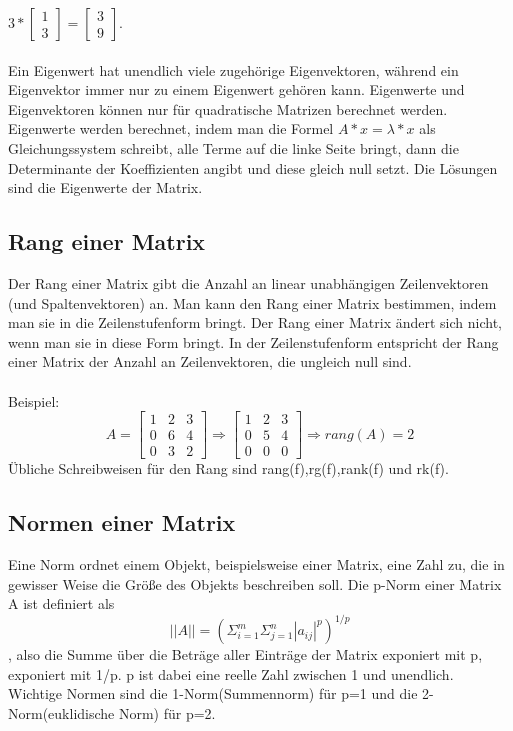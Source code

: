 \documentclass[11pt]{scrreprt}
\begin{document}
$3*\begin{bmatrix}
1 \\ 
3  
\end {bmatrix} 
=
\begin{bmatrix}
3  \\
9  
\end {bmatrix}
$.\\
\\
Ein Eigenwert hat unendlich viele zugehörige Eigenvektoren, während ein Eigenvektor immer nur zu einem Eigenwert gehören kann. Eigenwerte und Eigenvektoren können nur für quadratische Matrizen berechnet werden. Eigenwerte werden berechnet, indem man die Formel $A*x = \lambda * x$ als Gleichungssystem schreibt, alle Terme auf die linke Seite bringt, dann die Determinante der Koeffizienten angibt und diese gleich null setzt. Die Lösungen sind die Eigenwerte der Matrix.
\subsection{Rang einer Matrix}
Der Rang einer Matrix gibt die Anzahl an linear unabhängigen Zeilenvektoren (und Spaltenvektoren) an. Man kann den Rang einer Matrix bestimmen, indem man sie in die Zeilenstufenform bringt. Der Rang einer Matrix ändert sich nicht, wenn man sie in diese Form bringt. In der Zeilenstufenform entspricht der Rang einer Matrix der Anzahl an Zeilenvektoren, die ungleich null sind.\\
\\
Beispiel:
\begin{equation}
A = \begin{bmatrix}
1 & 2 & 3\\
0 & 6 & 4\\
0 & 3 & 2
\end{bmatrix}
\Rightarrow
\begin{bmatrix}
1 & 2 & 3\\
0 & 5 & 4\\
0 & 0 & 0
\end{bmatrix}
\Rightarrow rang(A) = 2
\end{equation}
Übliche Schreibweisen für den Rang sind rang(f),rg(f),rank(f) und rk(f).
\subsection{Normen einer Matrix}
Eine Norm ordnet einem Objekt, beispielsweise einer Matrix, eine Zahl zu, die in gewisser Weise die Größe des Objekts beschreiben soll.
Die p-Norm einer Matrix A ist definiert als
\begin{equation}
||A|| = (\Sigma_{i=1}^m \Sigma_{j=1}^n |a_{ij}|^p)^{1/p}
\end{equation}
, also die Summe über die Beträge aller Einträge der Matrix exponiert mit p,  exponiert mit 1/p. p ist dabei eine reelle Zahl zwischen 1 und unendlich. Wichtige Normen sind die 1-Norm(Summennorm) für p=1 und die 2-Norm(euklidische Norm) für p=2.
\end{document}
